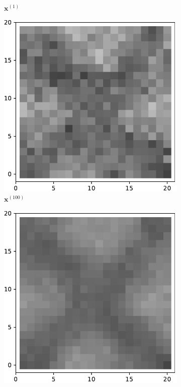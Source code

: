 \begin{figure}[h]
\begin{subfigure}[b]{0.24\textwidth}
            \caption[]%
            {{\small $\mathbf{x}^{(1)}$}}    
            \label{fig:5d21}
        \end{subfigure}
        \begin{subfigure}[b]{0.24\textwidth}   
            \centering 
            \includegraphics[width=\textwidth]{./img/5d2-99.pdf}
            \caption[]%
            {{\small $\mathbf{x}^{(100)}$}}    
            \label{fig:5d2100}
        \end{subfigure}
        \begin{subfigure}[b]{0.24\textwidth}   
            \centering 
            \includegraphics[width=\textwidth]{./img/5d2mean.pdf}

\end{subfigure}
\end{figure}
